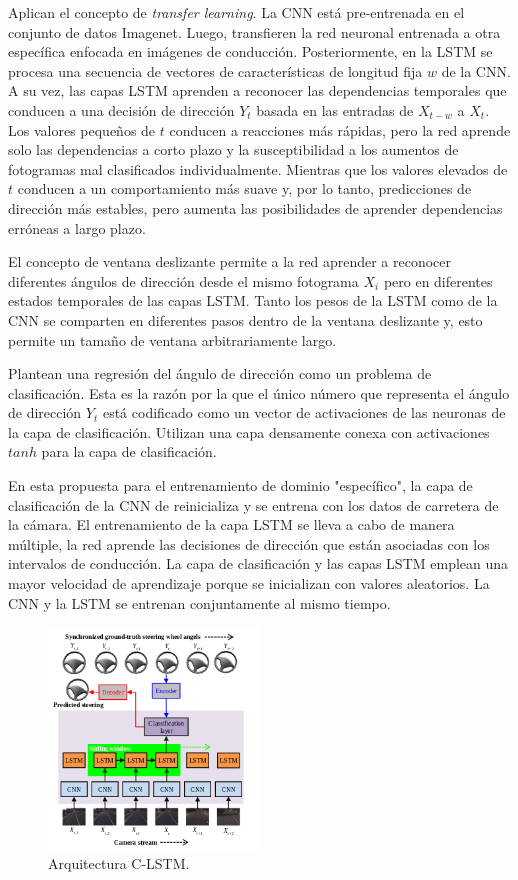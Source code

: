 Aplican el concepto de \textit{transfer learning}. La CNN está pre-entrenada en el conjunto de datos Imagenet. Luego, transfieren la red neuronal entrenada a otra específica enfocada en imágenes de conducción. Posteriormente, en la LSTM se procesa una secuencia de vectores de características de longitud fija $w$ de la CNN. A su vez, las capas LSTM aprenden a reconocer las dependencias temporales que conducen a una decisión de dirección $Y_t$ basada en las entradas de $X_{t-w}$ a $X_t$. Los valores pequeños de $t$ conducen a reacciones más rápidas, pero la red aprende solo las dependencias a corto plazo y la susceptibilidad a los aumentos de fotogramas mal clasificados individualmente. Mientras que los valores elevados de $t$ conducen a un comportamiento más suave y, por lo tanto, predicciones de dirección más estables, pero aumenta las posibilidades de aprender dependencias erróneas a largo plazo.

El concepto de ventana deslizante permite a la red aprender a reconocer diferentes ángulos de dirección desde el mismo fotograma $X_i$ pero en diferentes estados temporales de las capas LSTM. Tanto los pesos de la LSTM como de la CNN se comparten en diferentes pasos dentro de la ventana deslizante y, esto permite un tamaño de ventana arbitrariamente largo.

Plantean una regresión del ángulo de dirección como un problema de clasificación. Esta es la razón por la que el único número que representa el ángulo de dirección $Y_t$ está codificado como un vector de activaciones de las neuronas de la capa de clasificación. Utilizan una capa densamente conexa con activaciones $tanh$ para la capa de clasificación.

En esta propuesta para el entrenamiento de dominio "específico", la capa de clasificación de la CNN de reinicializa y se entrena con los datos de carretera de la cámara. El entrenamiento de la capa LSTM se lleva a cabo de manera múltiple, la red aprende las decisiones de dirección que están asociadas con los intervalos de conducción. La capa de clasificación y las capas LSTM emplean una mayor velocidad de aprendizaje porque se inicializan con valores aleatorios. La CNN y la LSTM se entrenan conjuntamente al mismo tiempo.

\begin{figure}
\begin{center}
	\includegraphics[width=0.5\textwidth]{img/clstm.png}
   \caption{Arquitectura C-LSTM.}
	\label{fig.clstm}
\end{center}
\end{figure}

